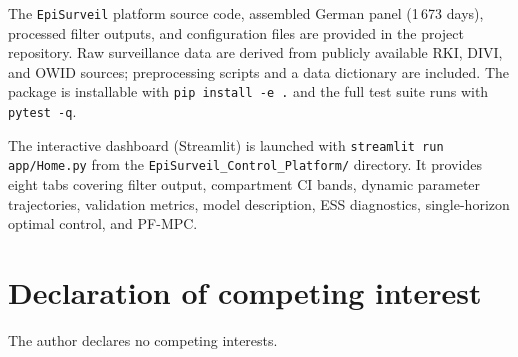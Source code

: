 \documentclass[11pt]{article}
\begin{document}
The \texttt{EpiSurveil} platform source code, assembled German panel
(1\,673 days), processed filter outputs, and configuration files are
provided in the project repository.
Raw surveillance data are derived from publicly available RKI, DIVI,
and OWID sources; preprocessing scripts and a data dictionary are
included.
The package is installable with \texttt{pip install -e .} and the
full test suite runs with \texttt{pytest -q}.

The interactive dashboard (Streamlit) is launched with
\texttt{streamlit run app/Home.py} from the
\texttt{EpiSurveil\_Control\_Platform/} directory.
It provides eight tabs covering filter output, compartment CI bands,
dynamic parameter trajectories, validation metrics, model description,
ESS diagnostics, single-horizon optimal control, and PF-MPC.


\section*{Declaration of competing interest}

The author declares no competing interests.
\end{document}
